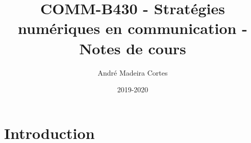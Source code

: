 \documentclass{article}
\title{COMM-B430 - Stratégies numériques en communication - Notes de cours}
\author{André Madeira Cortes}
\date{2019-2020}
\begin{document}
\maketitle

\section{Introduction}
\end{document}
